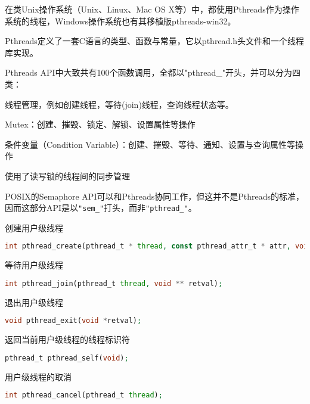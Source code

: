 在类Unix操作系统（Unix、Linux、Mac OS X等）中，都使用Pthreads作为操作系统的线程，Windows操作系统也有其移植版pthreads-win32。

Pthreads定义了一套C语言的类型、函数与常量，它以pthread.h头文件和一个线程库实现。

Pthreads API中大致共有100个函数调用，全都以"pthread_"开头，并可以分为四类：

\begin{compactitem}
\item 线程管理，例如创建线程，等待(join)线程，查询线程状态等。
\item Mutex：创建、摧毁、锁定、解锁、设置属性等操作
\item 条件变量（Condition Variable）：创建、摧毁、等待、通知、设置与查询属性等操作
\item 使用了读写锁的线程间的同步管理
\end{compactitem}

POSIX的Semaphore API可以和Pthreads协同工作，但这并不是Pthreads的标准，因而这部分API是以\texttt{"sem\_"}打头，而非\texttt{"pthread\_"}。



\begin{compactitem}
\item 创建用户级线程

\begin{lstlisting}[language=PHP]
int pthread_create(pthread_t * thread, const pthread_attr_t * attr, void *(*start_routine)(void *), void *arg);
\end{lstlisting}

\item 等待用户级线程

\begin{lstlisting}[language=PHP]
int pthread_join(pthread_t thread, void ** retval);
\end{lstlisting}

\item 退出用户级线程

\begin{lstlisting}[language=PHP]
void pthread_exit(void *retval);
\end{lstlisting}

\item 返回当前用户级线程的线程标识符

\begin{lstlisting}[language=PHP]
pthread_t pthread_self(void);
\end{lstlisting}

\item 用户级线程的取消

\begin{lstlisting}[language=PHP]
int pthread_cancel(pthread_t thread);
\end{lstlisting}

\end{compactitem}


